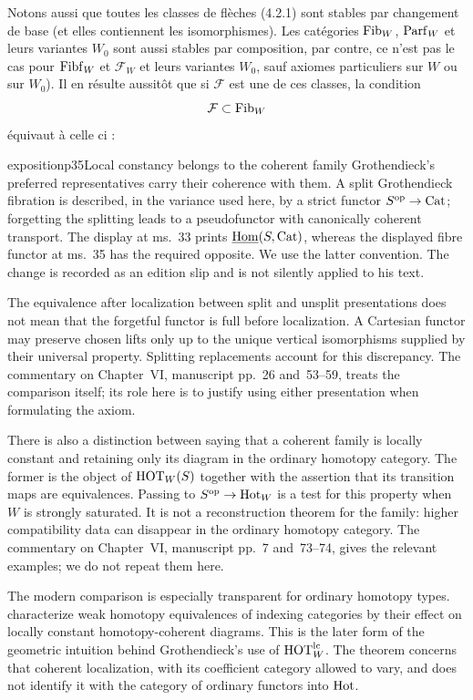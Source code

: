 Notons aussi que toutes les classes de flèches (4.2.1) sont stables par changement de base (et elles contiennent les isomorphismes). Les catégories $\mathrm{Fib}_W$, $\mathrm{Parf}_W$ et leurs variantes $W_0$ sont aussi stables par composition, par contre, ce n'est pas le cas pour $\mathrm{Fibf}_W$ et $\mathcal{F}_W$ et leurs variantes $W_0$, sauf axiomes particuliers sur $W$ ou sur $W_0$). Il en résulte aussitôt  que si $\mathcal{F}$ est une de ces classes, la condition %
\[
\mathcal{F} \subset \mathrm{Fib}_W
\]
équivaut à celle ci :

\begin{dcomment}{exposition}{p35}{Local constancy belongs to the coherent family}
Grothendieck's preferred representatives carry their coherence with them. A split Grothendieck fibration is described, in the variance used here, by a strict functor $S^{\mathrm{op}}\to\mathrm{Cat}$; forgetting the splitting leads to a pseudofunctor with canonically coherent transport. The display at ms.~33 prints $\underline{\mathrm{Hom}}(S,\mathrm{Cat})$, whereas the displayed fibre functor at ms.~35 has the required opposite. We use the latter convention. The change is recorded as an edition slip and is not silently applied to his text.

The equivalence after localization between split and unsplit presentations does not mean that the forgetful functor is full before localization. A Cartesian functor may preserve chosen lifts only up to the unique vertical isomorphisms supplied by their universal property. Splitting replacements account for this discrepancy. The commentary on Chapter~VI, manuscript pp.~26 and~53--59, treats the comparison itself; its role here is to justify using either presentation when formulating the axiom.

There is also a distinction between saying that a coherent family is locally constant and retaining only its diagram in the ordinary homotopy category. The former is the object of $\mathrm{HOT}_W(S)$ together with the assertion that its transition maps are equivalences. Passing to $S^{\mathrm{op}}\to\mathrm{Hot}_W$ is a test for this property when $W$ is strongly saturated. It is not a reconstruction theorem for the family: higher compatibility data can disappear in the ordinary homotopy category. The commentary on Chapter~VI, manuscript pp.~7 and~73--74, gives the relevant examples; we do not repeat them here.

The modern comparison is especially transparent for ordinary homotopy types. \citet[Definitions~1.1--1.2, Theorem~1.3, and Corollary~1.28]{Cisinski2009LocallyConstant} characterize weak homotopy equivalences of indexing categories by their effect on locally constant homotopy-coherent diagrams. This is the later form of the geometric intuition behind Grothendieck's use of $\mathrm{HOT}_W^{\mathrm{lc}}$. The theorem concerns that coherent localization, with its coefficient category allowed to vary, and does not identify it with the category of ordinary functors into $\mathrm{Hot}$.


\end{dcomment}
